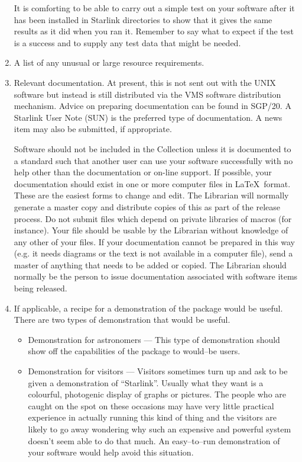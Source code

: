 \begin{enumerate}
It is comforting to be able to carry out a simple test on your software
after it has been installed in Starlink directories to show that it gives the
same results as it did when you ran it.
Remember to say what to expect if the test is a success and to supply any test
data that might be needed.

\item A list of any unusual or large resource requirements.

\item Relevant documentation. At present, this is not sent out with the
UNIX software but instead is still distributed via the VMS software
distribution mechanism. Advice on preparing documentation can be found in
SGP/20. A Starlink User Note (SUN) is the preferred type of documentation.
A news item may also be submitted, if appropriate.

Software should not be included in the Collection unless it is documented
to a standard such that another user can use your software successfully with no
help other than the documentation or on-line support.
If possible, your documentation should exist in one or more computer files in
\LaTeX\ format.
These are the easiest forms to change and edit.
The Librarian will normally generate a master copy and distribute copies of this
as part of the release process.
Do not submit files which depend on private libraries of macros (for instance).
Your file should be usable by the Librarian without knowledge of any other of
your files.
If your documentation cannot be prepared in this way (e.g. it needs diagrams or
the text is not available in a computer file), send a master of anything that
needs to be added or copied.
The Librarian should normally be the person to issue documentation associated
with software items being released.


\item If applicable, a recipe for a demonstration of the package would be
useful. There are two types of demonstration that would be useful.

\begin{itemize}

\item Demonstration for astronomers --- This type of demonstration should
show off the capabilities of the package to would--be users.

\item Demonstration for visitors ---
Visitors sometimes turn up and ask to be given a demonstration of
``Starlink''. Usually what they want is a colourful, photogenic display of
graphs or pictures. The people who are caught on the spot on these occasions
may have very little practical experience in actually running this kind of
thing and the visitors are likely to go away wondering why such an expensive
and powerful system doesn't seem able to do that much. An easy--to--run
demonstration of your software would help avoid this situation.


\end{itemize}
\end{enumerate}
